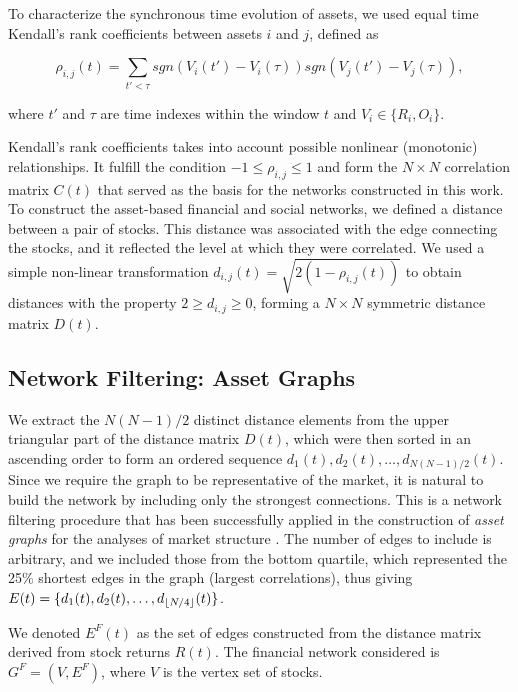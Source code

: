 \documentclass[]{book}
\theoremstyle{definition}
\theoremstyle{definition}
\theoremstyle{definition}
\theoremstyle{remark}
\begin{document}
To characterize the synchronous time evolution of assets, we used equal
time Kendall's rank coefficients between assets \(i\) and \(j\), defined
as

\begin{equation}
 \rho_{i, j}(t) = \sum\limits_{t' < \tau}sgn(V_i(t') - V_i(\tau))sgn(V_j(t') - V_j(\tau)),
\end{equation}

where \(t'\) and \(\tau\) are time indexes within the window \(t\) and
\(V_i \in \{R_i, O_i\}\).

Kendall's rank coefficients takes into account possible nonlinear
(monotonic) relationships. It fulfill the condition
\(-1 \leq \rho_{i, j} \leq 1\) and form the \(N \times N\) correlation
matrix \(C(t)\) that served as the basis for the networks constructed in
this work. To construct the asset-based financial and social networks,
we defined a distance between a pair of stocks. This distance was
associated with the edge connecting the stocks, and it reflected the
level at which they were correlated. We used a simple non-linear
transformation \(d_{i, j}(t) = \sqrt{2(1 - \rho_{i,j}(t))}\) to obtain
distances with the property \(2 \geq d_{i,j} \geq 0\), forming a
\(N \times N\) symmetric distance matrix \(D(t)\).

\subsection{Network Filtering: Asset
Graphs}\label{network-filtering-asset-graphs}

We extract the \(N(N-1)/2\) distinct distance elements from the upper
triangular part of the distance matrix \(D(t)\), which were then sorted
in an ascending order to form an ordered sequence
\(d_1(t), d_2(t), \ldots, d_{N(N-1)/2}(t)\). Since we require the graph
to be representative of the market, it is natural to build the network
by including only the strongest connections. This is a network filtering
procedure that has been successfully applied in the construction of
\textit{asset graphs} for the analyses of market structure
\cite{1402-4896-2003-T106-011, refId0-Onnela-2004}. The number of edges
to include is arbitrary, and we included those from the bottom quartile,
which represented the 25\% shortest edges in the graph (largest
correlations), thus giving
\(E(t) = \{d_1(t), d_2(t), \ldots, d_{\lfloor N/4\rfloor}(t)\}\).

We denoted \(E^{F}(t)\) as the set of edges constructed from the
distance matrix derived from stock returns \(R(t)\). The financial
network considered is \(G^{F} = ( V, E^{F} )\), where \(V\) is the
vertex set of stocks.
\end{document}
